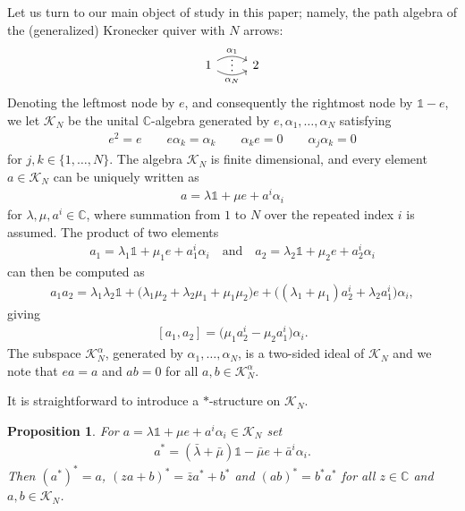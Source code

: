 \documentclass{amsart}
\newcommand{\complex}{\mathbb{C}}
\newcommand{\paraa}[1]{\big(#1\big)}
\newtheorem{proposition}[theorem]{Proposition}
\theoremstyle{definition}
\theoremstyle{remark}
\numberwithin{equation}{section}
\newcommand{\K}{\mathcal{K}}
\renewcommand{\mid}{\mathds{1}}
\newcommand{\KN}{\K_N}
\newcommand{\KaN}{\K^\alpha_N}
\begin{document}
Let us turn to our main object of study in this paper; namely, the
path algebra of the (generalized) Kronecker quiver with $N$ arrows:
\begin{displaymath}
  \begin{tikzcd}
    1
    \arrow[r, draw=none, "\raisebox{+1.5ex}{\vdots}" description]
    \arrow[r, bend left,        "\alpha_1"]
    \arrow[r, bend right, swap, "\alpha_N"]
    &
    2
  \end{tikzcd}
\end{displaymath}
Denoting the leftmost node by $e$, and consequently the rightmost node by $\mid-e$, we let
$\KN$ be the unital $\complex$-algebra generated by
$e,\alpha_1,\ldots,\alpha_N$ satisfying
\begin{align}\label{eq:kronecker.alg.relations}
  e^2=e\qquad
  e\alpha_k = \alpha_k\qquad
  \alpha_ke = 0\qquad
  \alpha_j\alpha_k = 0
\end{align}
for $j,k\in\{1,\ldots,N\}$. The algebra $\KN$ is finite
dimensional, and every element $a\in\KN$ can be uniquely written as
\begin{align*}
  a = \lambda\mid + \mu e + a^i\alpha_i
\end{align*}
for $\lambda,\mu,a^i\in\complex$,  where summation from $1$ to $N$ over the
repeated index $i$ is assumed. The product of two elements
\begin{align*}
  a_1 = \lambda_1\mid + \mu_1e + a_1^i\alpha_i\quad\text{and}\quad
  a_2 = \lambda_2\mid + \mu_2e + a_2^i\alpha_i
\end{align*}
can then be computed as
\begin{align}
  a_1a_2 = \lambda_1\lambda_2\mid +
  \paraa{\lambda_1\mu_2+\lambda_2\mu_1+\mu_1\mu_2}e+
  \paraa{(\lambda_1+\mu_1)a_2^i+\lambda_2a_1^i}\alpha_i,
\end{align}
giving
\begin{align}\label{eq:a1a2.commutator}
  [a_1,a_2] = \paraa{\mu_1a_2^i-\mu_2a_1^i}\alpha_i.
\end{align}
The subspace $\KaN$, generated by $\alpha_1,\ldots,\alpha_N$, is a
two-sided ideal of $\KN$ and we note that $ea=a$ and $ab=0$ for all
$a,b\in\KaN$.

It is straightforward to introduce a $\ast$-structure on $\KN$.

\begin{proposition}\label{prop:star.algebra.structure}
  For $a=\lambda\mid + \mu e + a^i\alpha_i\in\KN$ set
  \begin{align}
    a^\ast = (\bar{\lambda}+\bar{\mu})\mid-\bar{\mu} e+\bar{a}^i\alpha_i.
  \end{align}
  Then $(a^\ast)^\ast = a$, $(za+b)^\ast=\bar{z}a^\ast + b^\ast$ and
  $(ab)^\ast=b^\ast a^\ast$ for all $z\in\complex$ and $a,b\in\KN$.
\end{proposition}
\end{document}
